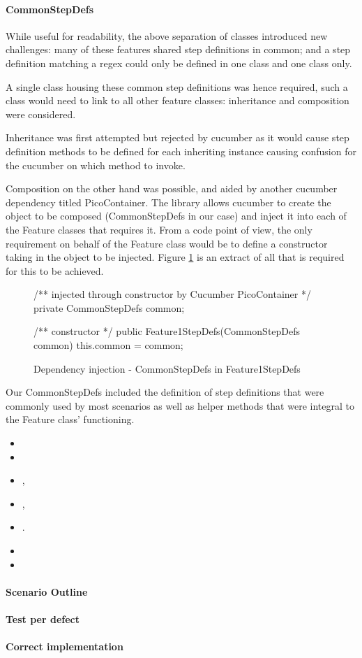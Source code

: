\paragraph{CommonStepDefs} 
While useful for readability, the above separation of classes introduced new challenges: many of these features shared step definitions in common; and a step definition matching a regex could only be defined in one class and one class only.
\par 
A single class housing these common step definitions was hence required, such a class would need to link to all other feature classes: inheritance and composition were considered.
\par
Inheritance was first attempted but rejected by cucumber as it would cause step definition methods to be defined for each inheriting instance causing confusion for the cucumber on which method to invoke. 
\par
Composition on the other hand was possible, and aided by another cucumber dependency titled PicoContainer.  The library allows cucumber to create the object to be composed (CommonStepDefs in our case) and inject it into each of the Feature classes that requires it. From a code point of view, the only requirement on behalf of the Feature class would be to define a constructor taking in the object to be injected. Figure \ref{code:cucumber-piccontainer-di} is an extract of all that is required for this to be achieved. 
\begin{figure}[H]
\begin{javacode}
/** injected through constructor by Cucumber PicoContainer */
private CommonStepDefs common;

/** constructor */ 
public Feature1StepDefs(CommonStepDefs common) {
    this.common = common;
}
\end{javacode}
\caption{Dependency injection - CommonStepDefs in Feature1StepDefs}    
\label{code:cucumber-piccontainer-di}
\end{figure}
Our CommonStepDefs included the definition of step definitions that were commonly used by most scenarios as well as helper methods that were integral to the Feature class' functioning. 
\begin{itemize}
    \item {}
    \item {}
    \item {}, 
    \item {}, 
    \item {}.
    \item {}
    \item {}
\end{itemize}

\paragraph{Scenario Outline}

\paragraph{Test per defect}

\paragraph{Correct implementation}